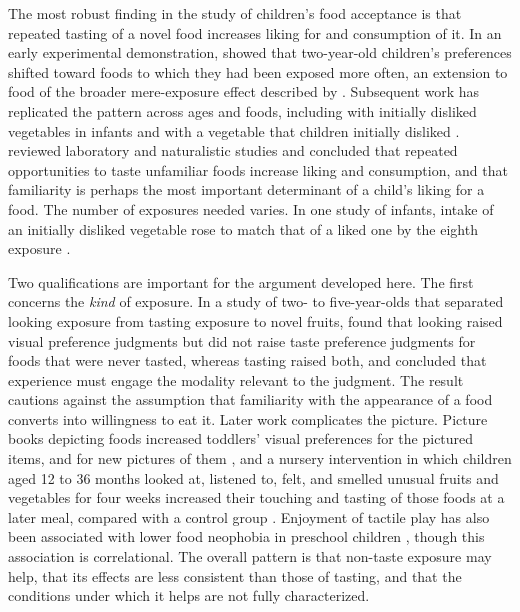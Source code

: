 \documentclass[11pt]{article}
\theoremstyle{remark}
\begin{document}
The most robust finding in the study of children's food acceptance is that repeated tasting of a novel food increases liking for and consumption of it. In an early experimental demonstration, \citet{birch1982dont} showed that two-year-old children's preferences shifted toward foods to which they had been exposed more often, an extension to food of the broader mere-exposure effect described by \citet{zajonc1968attitudinal}. Subsequent work has replicated the pattern across ages and foods, including with initially disliked vegetables in infants \citep{maier2007effects} and with a vegetable that children initially disliked \citep{wardle2003modifying}. \citet{cooke2007importance} reviewed laboratory and naturalistic studies and concluded that repeated opportunities to taste unfamiliar foods increase liking and consumption, and that familiarity is perhaps the most important determinant of a child's liking for a food. The number of exposures needed varies. In one study of infants, intake of an initially disliked vegetable rose to match that of a liked one by the eighth exposure \citep{maier2007effects}.

Two qualifications are important for the argument developed here. The first concerns the \emph{kind} of exposure. In a study of two- to five-year-olds that separated looking exposure from tasting exposure to novel fruits, \citet{birch1987what} found that looking raised visual preference judgments but did not raise taste preference judgments for foods that were never tasted, whereas tasting raised both, and concluded that experience must engage the modality relevant to the judgment. The result cautions against the assumption that familiarity with the appearance of a food converts into willingness to eat it. Later work complicates the picture. Picture books depicting foods increased toddlers' visual preferences for the pictured items, and for new pictures of them \citep{houstonprice2009picture}, and a nursery intervention in which children aged 12 to 36 months looked at, listened to, felt, and smelled unusual fruits and vegetables for four weeks increased their touching and tasting of those foods at a later meal, compared with a control group \citep{dazeley2015exposure}. Enjoyment of tactile play has also been associated with lower food neophobia in preschool children \citep{coulthard2015enjoyment}, though this association is correlational. The overall pattern is that non-taste exposure may help, that its effects are less consistent than those of tasting, and that the conditions under which it helps are not fully characterized.
\end{document}
